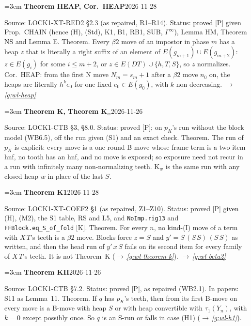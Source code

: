 \documentclass[11pt]{amsart}
\makeatletter
\newcounter{sense}
\newenvironment{entry}[3]{%
  \par\addvspace{\medskipamount}\noindent\phantomsection
  \def\@currentlabel{#2}\label{#1}\setcounter{sense}{0}\raggedright\emergencystretch=3em%
  \textbf{#2}\hfill{\footnotesize\textsf{#3}}\par\nopagebreak\noindent\ignorespaces}%
  {\par}
\newcommand{\src}[1]{\textsf{Source:} #1.\enskip}
\newcommand{\status}[1]{\textsf{Status:} #1.\enskip}
\newcommand{\appears}[1]{\textsf{In papers:} #1.\enskip}
\renewcommand{\see}[1]{$\rightarrow$\,\emph{\ref{#1}}}
\makeatother
\begin{document}
\begin{entry}{g:wl-heap-thm}{Theorem HEAP, Cor.~HEAP}{2026-11-28}
\src{LOCK1-XT-RED2 \S2.3 (as repaired, R1--R14)}
\status{proved [P] given Prop.~CHAIN (hence (H), (Std), K1, B1, RB1, SUB, $\Gamma^\infty$), Lemma HM,
Theorem NS and Lemma E}
Theorem. Every $\beta2$ move of an impostor in phase $m$ has a heap $z$ that is literally a right suffix
of an element of $E(g_{m+1})\cup E(g_{m+2})$: $z\in E(g_i)$ for some $i\le m+2$, or $z\in
E(DT)\cup\{h,T,S\}$, so $z$ normalizes. Cor.~HEAP: from the first N move $N_m=s_m+1$ after a $\beta2$
move $n_0$ on, the heaps are literally $h^ke_0$ for one fixed $e_0\in E(g_0)$, with $k$ non-decreasing. \see{g:wl-heap}
\end{entry}

\begin{entry}{g:wl-theorem-k}{Theorem K, Theorem K$_w$}{2026-11-26}
\src{LOCK1-CTB \S3, \S8.0}
\status{proved [P]; on $p_K$'s run without the block model (WB6.5), off the run given (S1) and an exact
check}
Theorem. The run of $p_K$ is explicit: every move is a one-round B-move whose frame term is a two-item
hnf, no tooth has an hnf, and no move is exposed; so exposure need not recur in a run with infinitely
many non-normalizing teeth. K$_w$ is the same run with any closed heap $w$ in place of the last $S$.
\end{entry}

\begin{entry}{g:wl-theorem-k1}{Theorem K1}{2026-11-28}
\src{LOCK1-XT-COEF2 \S1 (as repaired, Z1--Z10)}
\status{proved [P] given (H), (M2), the S1 table, RS and L5, and \texttt{NoImp.rig13} and
\texttt{FFBlock.eq\_S\_of\_fold} [K]}
Theorem. For every $n$, no kind-(I) move of a term with $X\,T$'s teeth is a $\beta2$ move. Blocks force
$z=S$ and $y'=S\,(S\,S)\,(S\,S)$ as written, and then the head run of $y'\,x\,S$ fails on its second item
for every family of $X\,T$'s teeth. It is not Theorem~K (\see{g:wl-theorem-k}). \see{g:wl-beta2}
\end{entry}

\begin{entry}{g:wl-theorem-kh}{Theorem KH}{2026-11-26}
\src{LOCK1-CTB \S7.2}
\status{proved [P], as repaired (WB2.1)}
\appears{S11 as Lemma~11}
Theorem. If $q$ has $p_K$'s teeth, then from its first B-move on every move is a B-move with heap $S$
or with heap convertible with $\tau_1(Y_n)$, with $k=0$ except possibly once. So $q$ is an S-run or
falls in case (H1) (\see{g:wl-h1}).
\end{entry}
\end{document}
